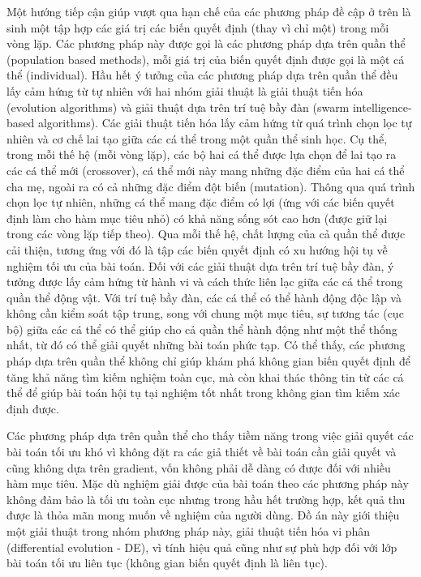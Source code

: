 \documentclass[../main.tex]{subfiles}
\begin{document}
Một hướng tiếp cận giúp vượt qua hạn chế của các phương pháp đề cập ở trên là sinh một tập hợp các giá trị các biến quyết định (thay vì chỉ một) trong mỗi vòng lặp. Các phương pháp này được gọi là các phương pháp dựa trên quần thể (population based methods), mỗi giá trị của biến quyết định được gọi là một cá thể (individual). Hầu hết ý tưởng của các phương pháp dựa trên quần thể đều lấy cảm hứng từ tự nhiên với hai nhóm giải thuật là giải thuật tiến hóa (evolution algorithms) và giải thuật dựa trên trí tuệ bầy đàn (swarm intelligence-based algorithms). Các giải thuật tiến hóa lấy cảm hứng từ quá trình chọn lọc tự nhiên và cơ chế lai tạo giữa các cá thể trong một quần thể sinh học. Cụ thể, trong mỗi thế hệ (mỗi vòng lặp), các bộ hai cá thể được lựa chọn để lai tạo ra các cá thể mới (crossover), cá thể mới này mang những đặc điểm của hai cá thể cha mẹ, ngoài ra có cả những đặc điểm đột biến (mutation). Thông qua quá trình chọn lọc tự nhiên, những cá thể mang đặc điểm có lợi (ứng với các biến quyết định làm cho hàm mục tiêu nhỏ) có khả năng sống sót cao hơn (được giữ lại trong các vòng lặp tiếp theo). Qua mỗi thế hệ, chất lượng của cả quần thể được cải thiện, tương ứng với đó là tập các biến quyết định có xu hướng hội tụ về nghiệm tối ưu của bài toán. Đối với các giải thuật dựa trên trí tuệ bầy đàn, ý tưởng được lấy cảm hứng từ hành vi và cách thức liên lạc giữa các cá thể trong quần thể động vật. Với trí tuệ bầy đàn, các cá thể có thể hành động độc lập và không cần kiểm soát tập trung, song với chung một mục tiêu, sự tương tác (cục bộ) giữa các cá thể có thể giúp cho cả quần thể hành động như một thể thống nhất, từ đó có thể giải quyết những bài toán phức tạp. Có thể thấy, các phương pháp dựa trên quần thể không chỉ giúp khám phá không gian biến quyết định để tăng khả năng tìm kiếm nghiệm toàn cục, mà còn khai thác thông tin từ các cá thể để giúp bài toán hội tụ tại nghiệm tốt nhất trong không gian tìm kiếm xác định được.

Các phương pháp dựa trên quần thể cho thấy tiềm năng trong việc giải quyết các bài toán tối ưu khó vì không đặt ra các giả thiết về bài toán cần giải quyết và cũng không dựa trên gradient, vốn không phải dễ dàng có được đối với nhiều hàm mục tiêu. Mặc dù nghiệm giải được của bài toán theo các phương pháp này không đảm bảo là tối ưu toàn cục nhưng trong hầu hết trường hợp, kết quả thu được là thỏa mãn mong muốn về nghiệm của người dùng. Đồ án này giới thiệu một giải thuật trong nhóm phương pháp này, giải thuật tiến hóa vi phân (differential evolution - DE), vì tính hiệu quả cũng như sự phù hợp đối với lớp bài toán tối ưu liên tục (không gian biến quyết định là liên tục). 
\end{document}
